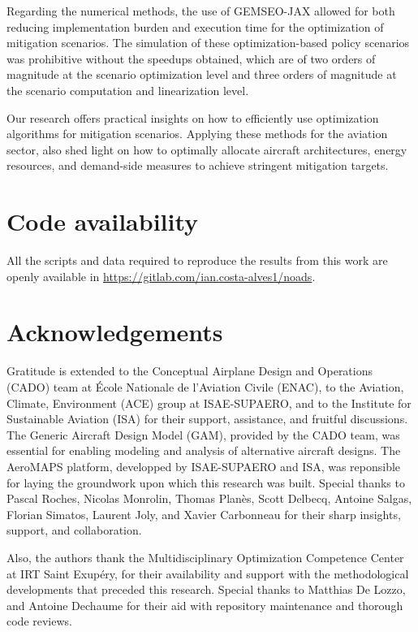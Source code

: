 \documentclass[a4paper,fleqn]{cas-dc}
\begin{document}
Regarding the numerical methods, the use of GEMSEO-JAX allowed for both reducing implementation burden and execution time for the optimization of mitigation scenarios. The simulation of these optimization-based policy scenarios was prohibitive without the speedups obtained, which are of two orders of magnitude at the scenario optimization level and three orders of magnitude at the scenario computation and linearization level.

Our research offers practical insights on how to efficiently use optimization algorithms for mitigation scenarios. Applying these methods for the aviation sector, also shed light on how to optimally allocate aircraft architectures, energy resources, and demand-side measures to achieve stringent mitigation targets.

\section*{Code availability}

All the scripts and data required to reproduce the results from this work are openly available in \url{https://gitlab.com/ian.costa-alves1/noads}.

\section*{Acknowledgements}

Gratitude is extended to the Conceptual Airplane Design and Operations (CADO) team at École Nationale de l'Aviation Civile (ENAC), to the Aviation, Climate, Environment (ACE) group at ISAE-SUPAERO, and to the Institute for Sustainable Aviation (ISA) for their support, assistance, and fruitful discussions. The Generic Aircraft Design Model (GAM), provided by the CADO team, was essential for enabling modeling and analysis of alternative aircraft designs. The AeroMAPS platform, developped by ISAE-SUPAERO and ISA, was reponsible for laying the groundwork upon which this research was built. Special thanks to Pascal Roches, Nicolas Monrolin, Thomas Planès, Scott Delbecq, Antoine Salgas, Florian Simatos, Laurent Joly, and Xavier Carbonneau for their sharp insights, support, and collaboration.

Also, the authors thank the Multidisciplinary Optimization Competence Center at IRT Saint Exupéry, for their availability and support with the methodological developments that preceded this research. Special thanks to Matthias De Lozzo, and Antoine Dechaume for their aid with repository maintenance and thorough code reviews.
\end{document}
